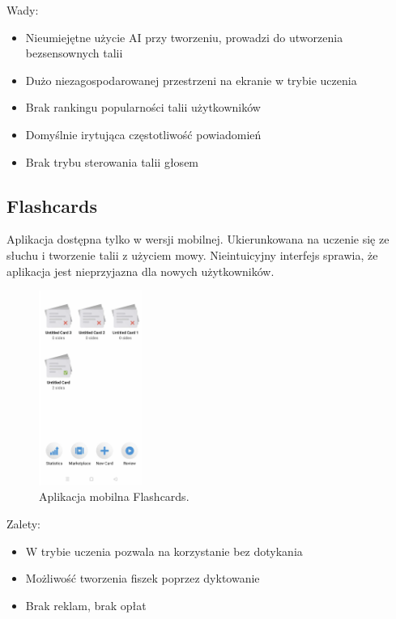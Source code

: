Wady:
\begin{itemize}
    \item Nieumiejętne użycie AI przy tworzeniu, prowadzi do utworzenia bezsensownych talii
    \item Dużo niezagospodarowanej przestrzeni na ekranie w trybie uczenia
    \item Brak rankingu popularności talii użytkowników
    \item Domyślnie irytująca częstotliwość powiadomień
    \item Brak trybu sterowania talii głosem
\end{itemize}

\subsection{Flashcards}

Aplikacja dostępna tylko w wersji mobilnej. Ukierunkowana na uczenie się ze słuchu i tworzenie talii z użyciem mowy. Nieintuicyjny interfejs sprawia, że aplikacja jest nieprzyjazna dla nowych użytkowników.

\begin{figure}[H]
    \centering
    \includegraphics[width=0.3\textwidth]{chapters/chapter_3/flashcards}
    \caption{Aplikacja mobilna Flashcards.}
    \label{img:flashcards}
\end{figure}

Zalety:
\begin{itemize}
    \item W trybie uczenia pozwala na korzystanie bez dotykania
    \item Możliwość tworzenia fiszek poprzez dyktowanie
    \item Brak reklam, brak opłat
\end{itemize}

